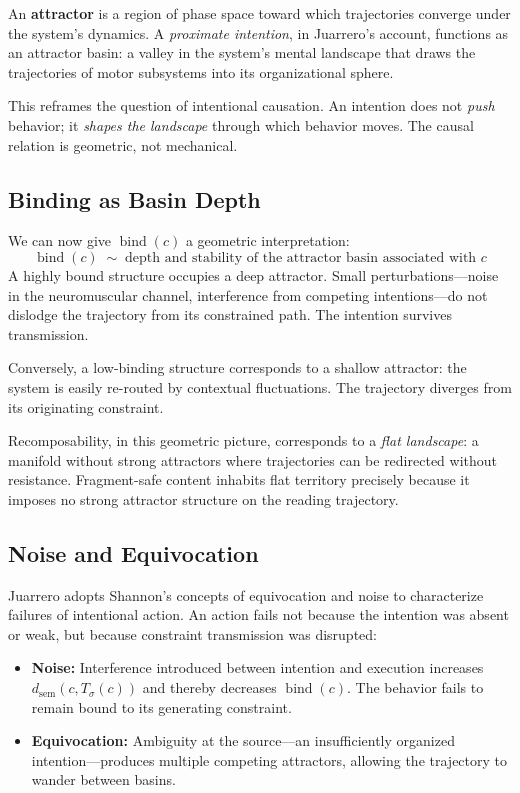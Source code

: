 \documentclass[11pt]{article}
\newcommand{\bind}{\operatorname{bind}}
\newcommand{\dsem}{d_{\mathrm{sem}}}
\begin{document}
An \textbf{attractor} is a region of phase space toward which trajectories converge under
the system's dynamics. A \emph{proximate intention}, in Juarrero's account, functions as
an attractor basin: a valley in the system's mental landscape that draws the trajectories
of motor subsystems into its organizational sphere.

This reframes the question of intentional causation. An intention does not \emph{push}
behavior; it \emph{shapes the landscape} through which behavior moves. The causal relation
is geometric, not mechanical.

\subsection{Binding as Basin Depth}

We can now give $\bind(c)$ a geometric interpretation:
\[
\bind(c) \;\sim\; \text{depth and stability of the attractor basin associated with } c
\]
A highly bound structure occupies a deep attractor. Small perturbations—noise in the
neuromuscular channel, interference from competing intentions—do not dislodge the
trajectory from its constrained path. The intention survives transmission.

Conversely, a low-binding structure corresponds to a shallow attractor: the system is
easily re-routed by contextual fluctuations. The trajectory diverges from its originating
constraint.

Recomposability, in this geometric picture, corresponds to a \emph{flat landscape}: a
manifold without strong attractors where trajectories can be redirected without
resistance. Fragment-safe content inhabits flat territory precisely because it imposes no
strong attractor structure on the reading trajectory.

\subsection{Noise and Equivocation}

Juarrero adopts Shannon's concepts of equivocation and noise to characterize failures of
intentional action. An action fails not because the intention was absent or weak, but
because constraint transmission was disrupted:

\begin{itemize}
  \item \textbf{Noise:} Interference introduced between intention and execution increases
        $\dsem(c, T_\sigma(c))$ and thereby decreases $\bind(c)$. The behavior fails to
        remain bound to its generating constraint.
  \item \textbf{Equivocation:} Ambiguity at the source—an insufficiently organized
        intention—produces multiple competing attractors, allowing the trajectory to
        wander between basins.
\end{itemize}
\end{document}
